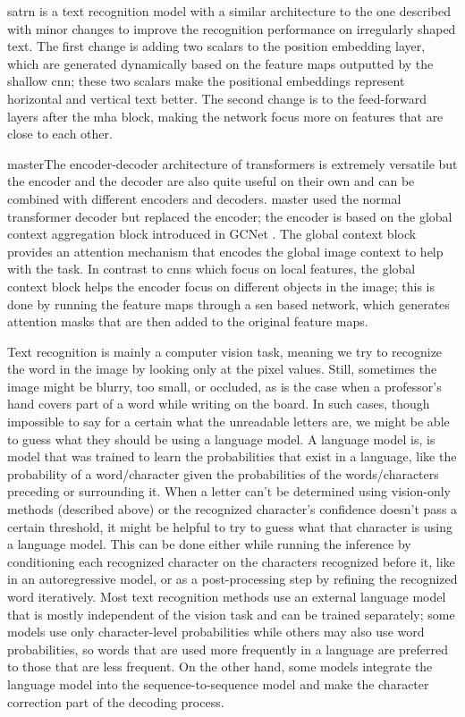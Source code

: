 \label{satrn}\gls{satrn} \cite{lee_recognizing_2020} is a text recognition model with a similar architecture to the one described with minor changes to improve the recognition performance on irregularly shaped text. The first change is adding two scalars to the position embedding layer, which are generated dynamically based on the feature maps outputted by the shallow \gls{cnn}; these two scalars make the positional embeddings represent horizontal and vertical text better. The second change is to the feed-forward layers after the \gls{mha} block, making the network focus more on features that are close to each other.

\label{master}\gls{master}The encoder-decoder architecture of transformers is extremely versatile but the encoder and the decoder are also quite useful on their own and can be combined with different encoders and decoders. \gls{master} \cite{lu_master_2021} used the normal transformer decoder but replaced the encoder; the encoder is based on the global context aggregation block introduced in GCNet \cite{cao_gcnet_2019}. The global context block provides an attention mechanism that encodes the global image context to help with the task. In contrast to \gls{cnn}s which focus on local features, the global context block helps the encoder focus on different objects in the image; this is done by running the feature maps through a \gls{sen} based network, which generates attention masks that are then added to the original feature maps.

Text recognition is mainly a computer vision task, meaning we try to recognize the word in the image by looking only at the pixel values. Still, sometimes the image might be blurry, too small, or occluded, as is the case when a professor's hand covers part of a word while writing on the board. In such cases, though impossible to say for a certain what the unreadable letters are, we might be able to guess what they should be using a language model. A language model is, is model that was trained to learn the probabilities that exist in a language, like the probability of a word/character given the probabilities of the words/characters preceding or surrounding it. When a letter can't be determined using vision-only methods (described above) or the recognized character's confidence doesn't pass a certain threshold, it might be helpful to try to guess what that character is using a language model. This can be done either while running the inference by conditioning each recognized character on the characters recognized before it, like in an autoregressive model, or as a post-processing step by refining the recognized word iteratively. Most text recognition methods use an external language model that is mostly independent of the vision task and can be trained separately; some models use only character-level probabilities while others may also use word probabilities, so words that are used more frequently in a language are preferred to those that are less frequent. On the other hand, some models integrate the language model into the sequence-to-sequence model and make the character correction part of the decoding process.


